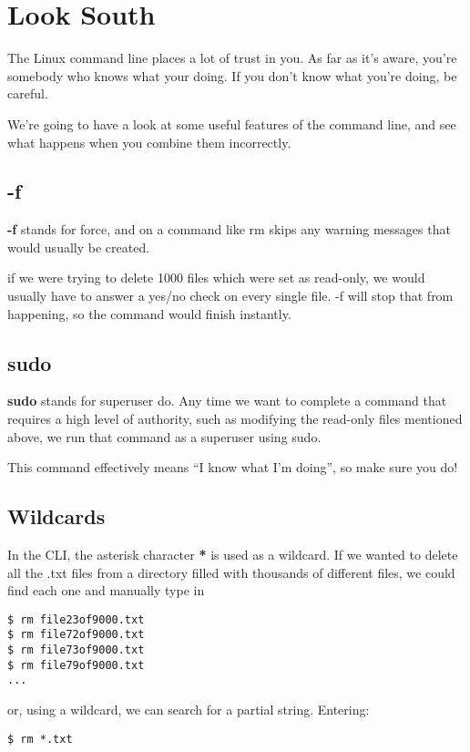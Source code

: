 \section{Look South}

	The Linux command line places a lot of trust in you. As far as it's aware, you're somebody who knows what your doing. If you don't know what you're doing, be careful.
	
	We're going to have a look at some useful features of the command line, and see what happens when you combine them incorrectly.
		
	\subsection*{-f}
	
		\textbf{-f} stands for force, and on a command like rm skips any warning messages that would usually be created.
		
		if we were trying to delete 1000 files which were set as read-only, we would usually have to answer a yes/no check on every single file. -f will stop that from happening, so the command would finish instantly.
	
	\subsection*{sudo}
	
		\textbf{sudo} stands for superuser do. Any time we want to complete a command that requires a high level of authority, such as modifying the read-only files mentioned above, we run that command as a superuser using sudo.
		
		This command effectively means ``I know what I'm doing'', so make sure you do!
	
	\subsection*{Wildcards}
	
		In the CLI, the asterisk character \textbf{*} is used as a wildcard. If we wanted to delete all the .txt files from a directory filled with thousands of different files, we could find each one and manually type in
	
\begin{lstlisting}
$ rm file23of9000.txt
$ rm file72of9000.txt
$ rm file73of9000.txt
$ rm file79of9000.txt
...
\end{lstlisting}

		or, using a wildcard, we can search for a partial string. Entering:
\begin{lstlisting}
$ rm *.txt
\end{lstlisting}

